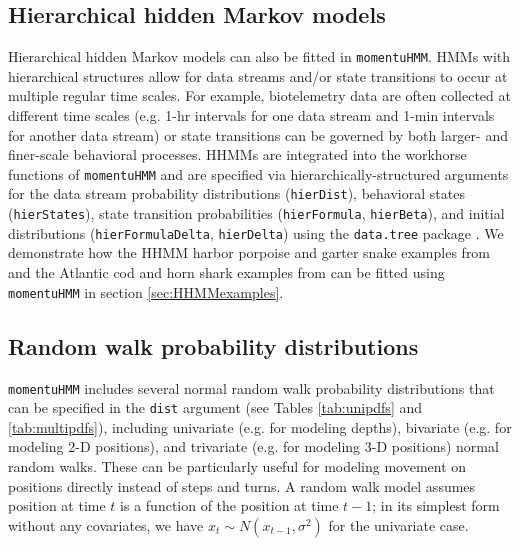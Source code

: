 \documentclass[12pt]{article}\usepackage[]{graphicx}\usepackage[]{xcolor}
\begin{document}
\subsection{Hierarchical hidden Markov models}
\label{sec:HHMM}
Hierarchical hidden Markov models \citep[HHMMs; see][]{Leos-BarajasEtAl2017,AdamEtAl2019} can also be fitted in \verb|momentuHMM|. HMMs with hierarchical structures allow for data streams and/or state transitions to occur at multiple regular time scales. For example, biotelemetry data are often collected at different time scales (e.g. 1-hr intervals for one data stream and 1-min intervals for another data stream) or state transitions can be governed by both larger- and finer-scale behavioral processes. HHMMs are integrated into the workhorse functions of \verb|momentuHMM| and are specified via hierarchically-structured arguments for the data stream probability distributions (\verb|hierDist|), behavioral states (\verb|hierStates|), state transition probabilities (\verb|hierFormula|, \verb|hierBeta|), and initial distributions (\verb|hierFormulaDelta|, \verb|hierDelta|) using the \verb|data.tree| package \citep{Glur2018}. We demonstrate how the HHMM harbor porpoise and garter snake examples from \cite{Leos-BarajasEtAl2017} and the Atlantic cod and horn shark examples from \cite{AdamEtAl2019} can be fitted using \verb|momentuHMM| in section \ref{sec:HHMMexamples}.

\subsection{Random walk probability distributions}
\label{sec:rw}
\verb|momentuHMM| includes several normal random walk probability distributions that can be specified in the \verb|dist| argument (see Tables \ref{tab:unipdfs} and \ref{tab:multipdfs}), including univariate (e.g. for modeling depths), bivariate (e.g. for modeling 2-D positions), and trivariate (e.g. for modeling 3-D positions) normal random walks. These can be particularly useful for modeling movement on positions directly instead of steps and turns. A random walk model assumes position at time $t$ is a function of the position at time $t-1$; in its simplest form without any covariates, we have $x_t \sim N(x_{t-1},\sigma^2)$ for the univariate case. 
\end{document}
